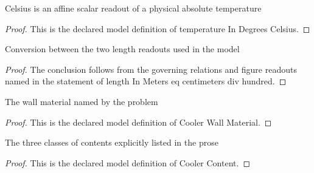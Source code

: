 \begin{definition}
  \label{def:physics:phyx-mini-0466:phyxminiproblems-problemphyxmini0466-temperatureindegreescelsius}
  Celsius is an affine scalar readout of a physical absolute temperature
\end{definition}
\begin{proof}
  This is the declared model definition of temperature In Degrees Celsius.
\end{proof}
\begin{lemma}
  \label{lem:physics:phyx-mini-0466:phyxminiproblems-problemphyxmini0466-lengthinmeters-eq-centimeters-div-hundred}
  Conversion between the two length readouts used in the model
\end{lemma}
\begin{proof}
  The conclusion follows from the governing relations and figure readouts named in the statement of length In Meters eq centimeters div hundred.
\end{proof}
\begin{definition}
  \label{def:physics:phyx-mini-0466:phyxminiproblems-problemphyxmini0466-coolerwallmaterial}
  The wall material named by the problem
\end{definition}
\begin{proof}
  This is the declared model definition of Cooler Wall Material.
\end{proof}
\begin{definition}
  \label{def:physics:phyx-mini-0466:phyxminiproblems-problemphyxmini0466-coolercontent}
  The three classes of contents explicitly listed in the prose
\end{definition}
\begin{proof}
  This is the declared model definition of Cooler Content.
\end{proof}
